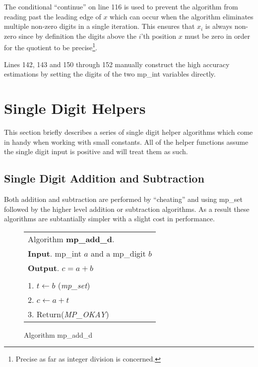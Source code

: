 \documentclass[b5paper]{book}
\begin{document}
The conditional ``continue'' on line 116 is used to prevent the algorithm from reading past the leading edge of $x$ which can occur when the
algorithm eliminates multiple non-zero digits in a single iteration.  This ensures that $x_i$ is always non-zero since by definition the digits
above the $i$'th position $x$ must be zero in order for the quotient to be precise\footnote{Precise as far as integer division is concerned.}.  

Lines 142, 143 and 150 through 152 manually construct the high accuracy estimations by setting the digits of the two mp\_int 
variables directly.  

\section{Single Digit Helpers}

This section briefly describes a series of single digit helper algorithms which come in handy when working with small constants.  All of 
the helper functions assume the single digit input is positive and will treat them as such.

\subsection{Single Digit Addition and Subtraction}

Both addition and subtraction are performed by ``cheating'' and using mp\_set followed by the higher level addition or subtraction 
algorithms.   As a result these algorithms are subtantially simpler with a slight cost in performance.

\newpage\begin{figure}[!here]
\begin{small}
\begin{center}
\begin{tabular}{l}
\hline Algorithm \textbf{mp\_add\_d}. \\
\textbf{Input}.   mp\_int $a$ and a mp\_digit $b$ \\
\textbf{Output}.  $c = a + b$ \\
\hline \\
1.  $t \leftarrow b$ (\textit{mp\_set}) \\
2.  $c \leftarrow a + t$ \\
3.  Return(\textit{MP\_OKAY}) \\
\hline
\end{tabular}
\end{center}
\end{small}
\caption{Algorithm mp\_add\_d}
\end{figure}
\end{document}
